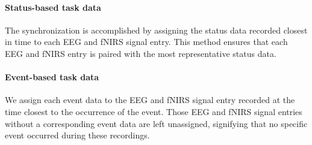 \paragraph{Status-based task data} The synchronization is accomplished by assigning the status data recorded closest in time to each EEG and fNIRS signal entry. This method ensures that each EEG and fNIRS entry is paired with the most representative status data.

\paragraph{Event-based task data} We assign each event data to the EEG and fNIRS signal entry recorded at the time closest to the occurrence of the event. Those EEG and fNIRS signal entries without a corresponding event data are left unassigned, signifying that no specific event occurred during these recordings.
